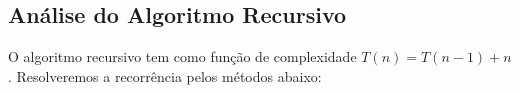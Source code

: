 \subsection{Análise do Algoritmo Recursivo}
O algoritmo recursivo tem como função de complexidade $T(n) = T(n - 1) + n$. Resolveremos a recorrência pelos métodos abaixo:



